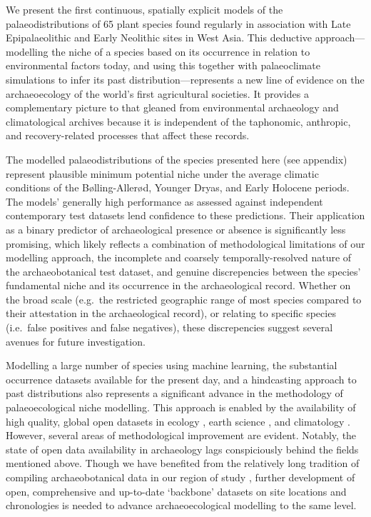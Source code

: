 \documentclass[
  authoryear,
  preprint]{elsarticle}
\begin{document}
We present the first continuous, spatially explicit models of the
palaeodistributions of 65 plant species found regularly in association
with Late Epipalaeolithic and Early Neolithic sites in West Asia. This
deductive approach---modelling the niche of a species based on its
occurrence in relation to environmental factors today, and using this
together with palaeoclimate simulations to infer its past
distribution---represents a new line of evidence on the archaeoecology
of the world's first agricultural societies. It provides a complementary
picture to that gleaned from environmental archaeology and
climatological archives because it is independent of the taphonomic,
anthropic, and recovery-related processes that affect these records.

The modelled palaeodistributions of the species presented here (see
appendix) represent plausible minimum potential niche under the average
climatic conditions of the Bølling-Allerød, Younger Dryas, and Early
Holocene periods. The models' generally high performance as assessed
against independent contemporary test datasets lend confidence to these
predictions. Their application as a binary predictor of archaeological
presence or absence is significantly less promising, which likely
reflects a combination of methodological limitations of our modelling
approach, the incomplete and coarsely temporally-resolved nature of the
archaeobotanical test dataset, and genuine discrepencies between the
species' fundamental niche and its occurrence in the archaeological
record. Whether on the broad scale (e.g.~the restricted geographic range
of most species compared to their attestation in the archaeological
record), or relating to specific species (i.e.~false positives and false
negatives), these discrepencies suggest several avenues for future
investigation.

Modelling a large number of species using machine learning, the
substantial occurrence datasets available for the present day, and a
hindcasting approach to past distributions also represents a significant
advance in the methodology of palaeoecological niche modelling. This
approach is enabled by the availability of high quality, global open
datasets in ecology \citep{GBIF2025, GBIFSecretariat2023}, earth science
\citep{SRTM}, and climatology \citep{KargerEtAl2017, BrownEtAl2018}.
However, several areas of methodological improvement are evident.
Notably, the state of open data availability in archaeology lags
conspiciously behind the fields mentioned above. Though we have
benefited from the relatively long tradition of compiling
archaeobotanical data in our region of study
\citep{ColledgeEtAl2004, ShennanConolly2007, ADEMNES, LucasFuller2018, FullerEtAl2018, WallaceEtAl2018, ORIGINS},
further development of open, comprehensive and up-to-date `backbone'
datasets on site locations and chronologies is needed to advance
archaeoecological modelling to the same level.
\end{document}
